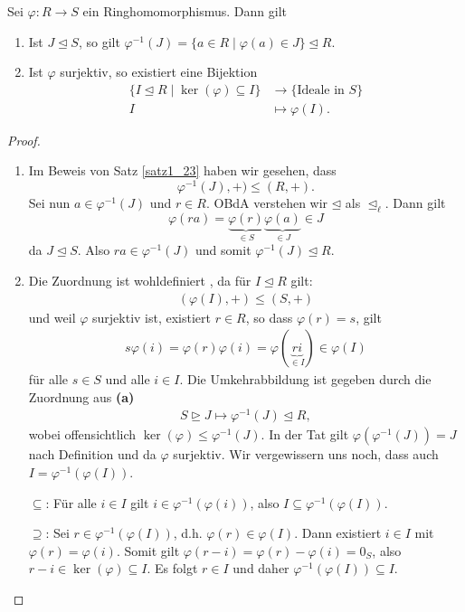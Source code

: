 \begin{satz}[Idealkorrespondenz]\label{satz4_13}
	Sei $\varphi\colon R \to S$ ein Ringhomomorphismus. Dann gilt
	\begin{enumerate}[label=(\alph*)]
		\item Ist $J \unlhd S$, so gilt $\varphi^{-1}(J) = \{a \in R \mid \varphi(a) \in J\} \unlhd R$.
		\item Ist $\varphi$ surjektiv, so existiert eine Bijektion
		\begin{align*}
			\{I \unlhd R \mid \ker(\varphi) \subseteq I\} &\to \{\text{Ideale in } S\}\\
			I &\mapsto \varphi(I).
		\end{align*}
	\end{enumerate}
\end{satz}
\begin{proof}
	\begin{enumerate}[label=(\alph*)]
		\item Im Beweis von Satz \ref{satz1_23} haben wir gesehen, dass
		\[\varphi^{-1}(J), +) \leq (R,+).\]
		Sei nun $a \in \varphi^{-1}(J)$ und $r \in R$. OBdA verstehen wir $\unlhd$ als $\unlhd_\ell$. Dann gilt
		\[\varphi(ra) = \underbrace{\varphi(r)}_{\in S}\underbrace{\varphi(a)}_{\in J} \in J\]
		da $J \unlhd S$. Also $ra \in \varphi^{-1}(J)$ und somit $\varphi^{-1}(J) \unlhd R$.
		\item Die Zuordnung ist wohldefiniert , da für $I \unlhd R$ gilt:
		\begin{align*}
			(\varphi(I), +) \leq (S,+) 
		\end{align*}
		und weil $\varphi$ surjektiv ist, existiert $r \in R$, so dass $\varphi(r) = s$, gilt
		\begin{align*}
			s \varphi(i) = \varphi(r)\varphi(i) = \varphi(\underbrace{ri}_{\in I}) \in \varphi(I)
		\end{align*}
		für alle $s \in S$ und alle $i \in I$. Die Umkehrabbildung ist gegeben durch die Zuordnung aus \textbf{(a)}
		\begin{align*}
			S \unrhd J \mapsto \varphi^{-1}(J) \unlhd R,
		\end{align*}
		wobei offensichtlich $\ker(\varphi) \leq \varphi^{-1}(J)$. In der Tat gilt $\varphi(\varphi^{-1}(J)) = J$ nach Definition und da $\varphi$ surjektiv. Wir vergewissern uns noch, dass auch $I = \varphi^{-1}(\varphi(I))$.
		
		\glqq{}$\subseteq$\grqq: Für alle $i \in I$ gilt $i \in \varphi^{-1}(\varphi(i))$, also $I \subseteq \varphi^{-1}(\varphi(I))$.
		
		\glqq{}$\supseteq$\grqq: Sei $r \in \varphi^{-1}(\varphi(I))$, d.h. $\varphi(r) \in \varphi(I)$. Dann existiert $i \in I$ mit $\varphi(r) = \varphi(i)$. Somit gilt $\varphi(r-i) = \varphi(r) - \varphi(i) = 0_S$, also $r-i \in \ker(\varphi) \subseteq I$. Es folgt $r \in I$ und daher $\varphi^{-1}(\varphi(I)) \subseteq I$.
	\end{enumerate}
\end{proof}
